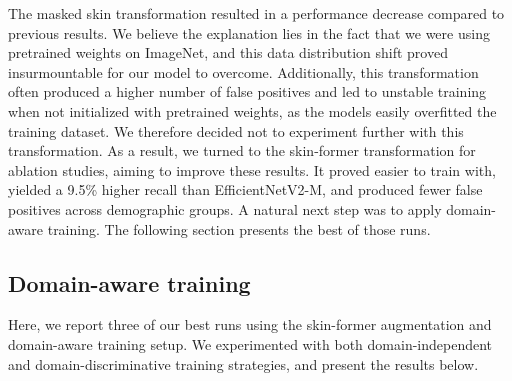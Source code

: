 The masked skin transformation resulted in a performance decrease compared to previous results. We believe the explanation lies in the fact that we were using pretrained weights on ImageNet, and this data distribution shift proved insurmountable for our model to overcome. 
Additionally, this transformation often produced a higher number of false positives and led to unstable training when not initialized with pretrained weights, as the models easily overfitted the training dataset. We therefore decided not to experiment further with this transformation.
As a result, we turned to the skin-former transformation for ablation studies, aiming to improve these results. It proved easier to train with, yielded a 9.5\% higher recall than EfficientNetV2-M, and produced fewer false positives across demographic groups.
A natural next step was to apply domain-aware training. The following section presents the best of those runs.


\subsection{Domain-aware training}
Here, we report three of our best runs using the skin-former augmentation and domain-aware training setup. We experimented with both domain-independent and domain-discriminative training strategies, and present the results below.


\begin{table}[H]
\centering
\caption{Performance of domain-discriminatively and domain-independently trained ConvNeXt-Tiny models using 224×224 CIELAB images with optional skin-former augmentation.}
\label{tab:domain-transformers}

\end{table}

